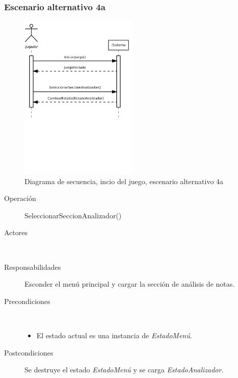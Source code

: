 \subsubsection{Escenario alternativo 4a}
\begin{figure}[h!]
  \centering
  \includegraphics[trim=0cm 12cm 0cm 0cm, clip=true, width=0.5\textwidth]{4_analisis/diagsec_caso1_esc2}
  \caption{Diagrama de secuencia, incio del juego, escenario alternativo 4a}
\end{figure}

\begin{description}
\item[Operación] SeleccionarSeccionAnalizador()
\item[Actores] \jugador\, \sistema\
\item[Responsabilidades] Esconder el menú principal y cargar la sección de
  análisis de notas.
\item[Precondiciones] $\quad$
  \begin{itemize}
  \item El estado actual es una instancia de \textit{EstadoMenú}.
  \end{itemize}
\item[Postcondiciones] Se destruye el estado \textit{EstadoMenú} y se carga
  \textit{EstadoAnalizador}.
\end{description}

